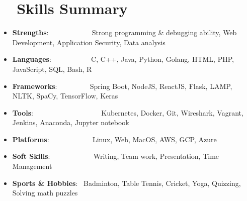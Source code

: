 \documentclass[a4paper,20pt]{article}
\newcommand{\resumeItem}[2]{
  \item\small{
    \textbf{#1}{: #2 \vspace{-2pt}}
  }
}
\newcommand{\resumeSubItem}[2]{\resumeItem{#1}{#2}\vspace{-3pt}}
\newcommand{\resumeSubHeadingListStart}{\begin{itemize}[leftmargin=*]}
\newcommand{\resumeSubHeadingListEnd}{\end{itemize}}
\begin{document}
\vspace{-5pt}
\section{~~Skills Summary}
	\resumeSubHeadingListStart
	\resumeSubItem{Strengths}{~~~~~~~~~~~ Strong programming \& debugging ability, Web Development, Application Security, Data analysis}
	\resumeSubItem{Languages}{~~~~~~~~~~ C, C++, Java, Python, Golang, HTML, PHP, JavaScript, SQL, Bash, R}
	\resumeSubItem{Frameworks}{~~~~~~~~ Spring Boot, NodeJS, ReactJS, Flask, LAMP, NLTK, SpaCy, TensorFlow, Keras}
	\resumeSubItem{Tools}{~~~~~~~~~~~~~~~~~~ Kubernetes, Docker, Git, Wireshark, Vagrant, Jenkins, Anaconda, Jupyter notebook}
	\resumeSubItem{Platforms}{~~~~~~~~~~~ Linux, Web, MacOS, AWS, GCP, Azure}
	\resumeSubItem{Soft Skills}{~~~~~~~~~~~ Writing, Team work, Presentation, Time Management}
	\resumeSubItem{Sports \& Hobbies}{~Badminton, Table Tennis, Cricket, Yoga, Quizzing, Solving math puzzles}
\resumeSubHeadingListEnd

\vspace{-5pt}
\end{document}
